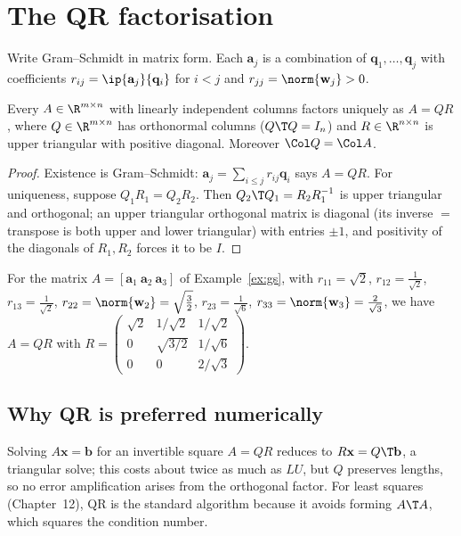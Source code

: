 \section{The QR factorisation}

Write Gram--Schmidt in matrix form. Each $\mathbf{a}_j$ is a combination of $\mathbf{q}_1,\dots,\mathbf{q}_j$ with coefficients $r_{ij}=\ip{\mathbf{a}_j}{\mathbf{q}_i}$ for $i<j$ and $r_{jj}=\norm{\mathbf{w}_j}>0$.

\begin{theorem}[QR factorisation]\label{thm:qr}
Every $A\in\R^{m\times n}$ with linearly independent columns factors uniquely as $A=QR$, where $Q\in\R^{m\times n}$ has orthonormal columns ($Q\T Q=I_n$) and $R\in\R^{n\times n}$ is upper triangular with positive diagonal. Moreover $\Col Q=\Col A$.
\end{theorem}

\begin{proof}
Existence is Gram--Schmidt: $\mathbf{a}_j=\sum_{i\le j}r_{ij}\mathbf{q}_i$ says $A=QR$. For uniqueness, suppose $Q_1R_1=Q_2R_2$. Then $Q_2\T Q_1=R_2R_1^{-1}$ is upper triangular and orthogonal; an upper triangular orthogonal matrix is diagonal (its inverse $=$ transpose is both upper and lower triangular) with entries $\pm1$, and positivity of the diagonals of $R_1,R_2$ forces it to be $I$.
\end{proof}

\begin{example}
For the matrix $A=[\mathbf{a}_1\ \mathbf{a}_2\ \mathbf{a}_3]$ of Example~\ref{ex:gs}, with $r_{11}=\sqrt2$, $r_{12}=\frac1{\sqrt2}$, $r_{13}=\frac1{\sqrt2}$, $r_{22}=\norm{\mathbf{w}_2}=\sqrt{\tfrac32}$, $r_{23}=\frac1{\sqrt6}$, $r_{33}=\norm{\mathbf{w}_3}=\frac{2}{\sqrt3}$, we have $A=QR$ with $R=\begin{pmatrix}\sqrt2&1/\sqrt2&1/\sqrt2\\0&\sqrt{3/2}&1/\sqrt6\\0&0&2/\sqrt3\end{pmatrix}$.
\end{example}

\subsection*{Why QR is preferred numerically}

Solving $A\mathbf{x}=\mathbf{b}$ for an invertible square $A=QR$ reduces to $R\mathbf{x}=Q\T\mathbf{b}$, a triangular solve; this costs about twice as much as $LU$, but $Q$ preserves lengths, so no error amplification arises from the orthogonal factor. For least squares (Chapter~12), QR is the standard algorithm because it avoids forming $A\T A$, which squares the condition number.

